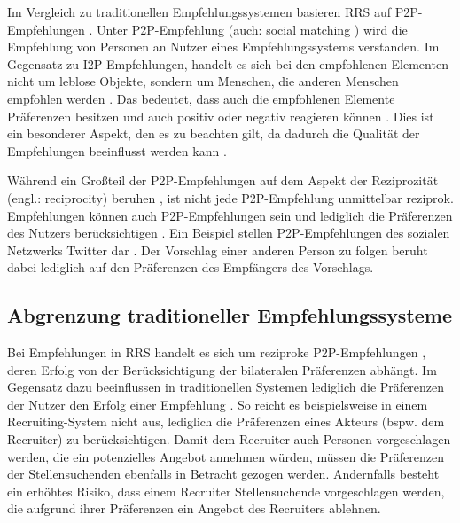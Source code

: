 
Im Vergleich zu traditionellen Empfehlungssystemen basieren \ac{RRS} auf \ac{P2P}-Empfehlungen \cite[S. 207]{pizzato:2010}.
Unter \ac{P2P}-Empfehlung (auch: social matching \cite[S. 208]{pizzato:2010}) wird die Empfehlung von Personen an Nutzer eines Empfehlungssystems verstanden.
Im Gegensatz zu \ac{I2P}-Empfehlungen, handelt es sich bei den empfohlenen Elementen nicht um leblose Objekte, sondern um Menschen, die anderen Menschen empfohlen werden \cite[S. 2]{kazienko:inbook}.
Das bedeutet, dass auch die empfohlenen Elemente Präferenzen besitzen und auch positiv oder negativ reagieren können \cite[S. 2]{kazienko:inbook}.
Dies ist ein besonderer Aspekt, den es zu beachten gilt, da dadurch die Qualität der Empfehlungen beeinflusst werden kann \cite[S. 208]{pizzato:2010}\cite[S. 2199]{akehurst:inproceedings}.

Während ein Großteil der \ac{P2P}-Empfehlungen auf dem Aspekt der Reziprozität (engl.: reciprocity) beruhen \cite[S. 545]{koprinska:inbook}, ist nicht jede \ac{P2P}-Empfehlung unmittelbar reziprok.
Empfehlungen können auch \ac{P2P}-Empfehlungen sein und lediglich die Präferenzen des Nutzers berücksichtigen \cite[S. 2429]{palomares:inproceedings}.
Ein Beispiel stellen \ac{P2P}-Empfehlungen des sozialen Netzwerks Twitter dar \cite[S. 2429]{palomares:inproceedings}.
Der Vorschlag einer anderen Person zu folgen beruht dabei lediglich auf den Präferenzen des Empfängers des Vorschlags.

\subsection{Abgrenzung traditioneller Empfehlungssysteme}
\label{ch:empfehlungssysteme:rrs:traditional_vs_rrs}
Bei Empfehlungen in \ac{RRS} handelt es sich um reziproke \ac{P2P}-Empfehlungen \cite[S. 207]{pizzato:2010}, deren Erfolg von der Berücksichtigung der bilateralen Präferenzen abhängt.
Im Gegensatz dazu beeinflussen in traditionellen Systemen lediglich die Präferenzen der Nutzer den Erfolg einer Empfehlung \cite[S. 1468]{yildirim:article}.
So reicht es beispielsweise in einem Recruiting-System nicht aus, lediglich die Präferenzen eines Akteurs (bspw. dem Recruiter) zu berücksichtigen.
Damit dem Recruiter auch Personen vorgeschlagen werden, die ein potenzielles Angebot annehmen würden, müssen die Präferenzen der Stellensuchenden ebenfalls in Betracht gezogen werden.
Andernfalls besteht ein erhöhtes Risiko, dass einem Recruiter Stellensuchende vorgeschlagen werden, die aufgrund ihrer Präferenzen ein Angebot des Recruiters ablehnen.

